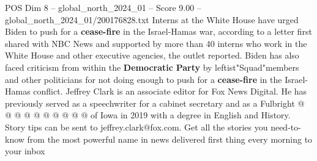 \begin{textsample}{POS Dim 8 – global\_north\_2024\_01 – Score 9.00 – global\_north\_2024\_01/200176828.txt}
Interns at the White House have urged Biden to push for a \textbf{cease-fire} in the Israel-Hamas war, according to a letter first shared with NBC News and supported by more than 40 interns who work in the White House and other executive agencies, the outlet reported.
Biden has also faced criticism from within the \textbf{Democratic} \textbf{Party} by leftist"Squad"members and other politicians for not doing enough to push for a \textbf{cease-fire} in the Israel-Hamas conflict.
Jeffrey Clark is an associate editor for Fox News Digital.
He has previously served as a speechwriter for a cabinet secretary and as a Fulbright @ @ @ @ @ @ @ @ @ @ of Iowa in 2019 with a degree in English and History.
Story tips can be sent to jeffrey.clark@fox.com.
Get all the stories you need-to-know from the most powerful name in news delivered first thing every morning to your inbox

\end{textsample}

